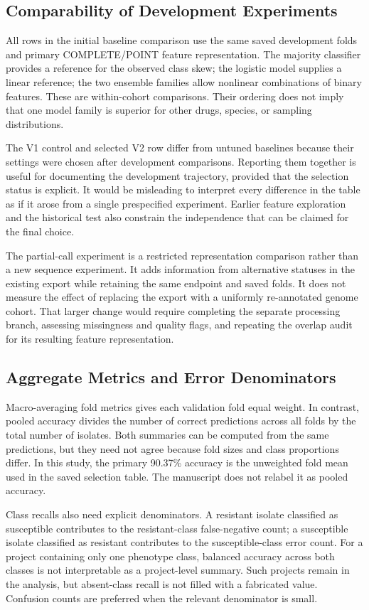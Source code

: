 \subsection{Comparability of Development Experiments}
All rows in the initial baseline comparison use the same saved development folds and primary COMPLETE/POINT feature representation. The majority classifier provides a reference for the observed class skew; the logistic model supplies a linear reference; the two ensemble families allow nonlinear combinations of binary features. These are within-cohort comparisons. Their ordering does not imply that one model family is superior for other drugs, species, or sampling distributions.

The V1 control and selected V2 row differ from untuned baselines because their settings were chosen after development comparisons. Reporting them together is useful for documenting the development trajectory, provided that the selection status is explicit. It would be misleading to interpret every difference in the table as if it arose from a single prespecified experiment. Earlier feature exploration and the historical test also constrain the independence that can be claimed for the final choice.

The partial-call experiment is a restricted representation comparison rather than a new sequence experiment. It adds information from alternative statuses in the existing export while retaining the same endpoint and saved folds. It does not measure the effect of replacing the export with a uniformly re-annotated genome cohort. That larger change would require completing the separate processing branch, assessing missingness and quality flags, and repeating the overlap audit for its resulting feature representation.

\subsection{Aggregate Metrics and Error Denominators}
Macro-averaging fold metrics gives each validation fold equal weight. In contrast, pooled accuracy divides the number of correct predictions across all folds by the total number of isolates. Both summaries can be computed from the same predictions, but they need not agree because fold sizes and class proportions differ. In this study, the primary 90.37\% accuracy is the unweighted fold mean used in the saved selection table. The manuscript does not relabel it as pooled accuracy.

Class recalls also need explicit denominators. A resistant isolate classified as susceptible contributes to the resistant-class false-negative count; a susceptible isolate classified as resistant contributes to the susceptible-class error count. For a project containing only one phenotype class, balanced accuracy across both classes is not interpretable as a project-level summary. Such projects remain in the analysis, but absent-class recall is not filled with a fabricated value. Confusion counts are preferred when the relevant denominator is small.

